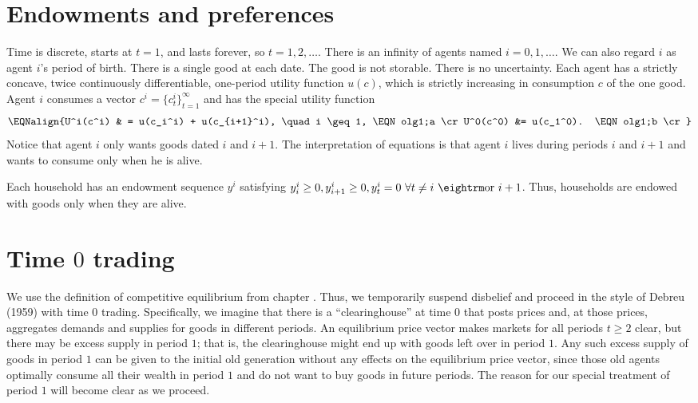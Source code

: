 \section{Endowments and preferences}

Time is discrete, starts at $t=1$,
and  lasts forever, so $t=1, 2, \ldots$. There is an infinity of agents
named $i=0, 1, \ldots$.  We can also regard $i$ as agent $i$'s period of
birth.
  There is a single good at each date. The good is not storable.  There is no uncertainty.
  Each agent has a
strictly concave, twice  continuously
differentiable, one-period utility function $u(c)$, which
is strictly increasing in consumption  $c$ of the one good.
  Agent $i$ consumes
a vector $c^i = \{c_t^i\}_{t=1}^\infty$ and has the
special utility function
$$\EQNalign{U^i(c^i) & = u(c_i^i) + u(c_{i+1}^i), \quad i \geq 1,
 \EQN olg1;a \cr
    U^0(c^0) &= u(c_1^0). \EQN olg1;b \cr} $$
Notice that agent $i$ only wants goods dated $i$ and $i+1$.
The interpretation of equations  is that agent $i$ lives during
periods $i$ and $i+1$ and wants to consume only when he is alive.

Each household has an endowment sequence $y^i$ satisfying
$y_i^i \geq 0, y^i_{i+1} \geq 0, y_t^i = 0 \ \forall t \neq i \ {\rm or}
\ i+1$.
Thus, households are endowed with goods only when
they are alive.


\section{Time $0$ trading}

We use the definition of competitive equilibrium from chapter .
Thus, we temporarily suspend disbelief and proceed in the style
of Debreu (1959) with time $0$ trading.
%
Specifically, we imagine that there is a ``clearinghouse'' at
time $0$ that posts prices and, at those prices, aggregates demands and supplies for goods in different periods.
An equilibrium price vector makes markets for  all
periods $t\geq 2$ clear,  but there  may be
excess supply in period $1$; that is, the clearinghouse might
end up with goods left over in period $1$. Any such excess supply of
goods in period $1$ can be given to the initial old
generation without any effects on the equilibrium price vector,
since those old  agents optimally consume all
their wealth in period $1$ and do not want to buy  goods
in future periods. The reason for our special treatment of
period $1$  will become clear as we proceed.


